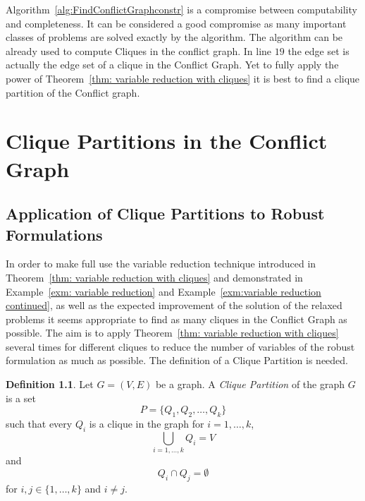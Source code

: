 \documentclass[titlepage, a4paper]{amsbook}
\theoremstyle{plain}
\theoremstyle{break}
\theoremstyle{definition}
\newtheorem{dfn}[thm]{Definition}
\theoremstyle{remark}
\numberwithin{equation}{thm}
\begin{document}
Algorithm~\ref{alg:FindConflictGraphconstr} is a compromise between computability and completeness. It can be considered a good compromise as many important classes of problems are solved exactly by the algorithm.
The algorithm can be already used to compute Cliques in the conflict graph. In line $19$ the edge set is actually the edge set of a clique in the Conflict Graph. Yet to fully apply the power of Theorem~\ref{thm: variable reduction with cliques} it is best to find a clique partition of the Conflict graph.


\chapter{Clique Partitions in the Conflict Graph}
\section{Application of Clique Partitions to Robust Formulations}
In order to make full use the variable reduction technique introduced in Theorem~\ref{thm: variable reduction with cliques} and demonstrated in Example~\ref{exm: variable reduction} and Example~\ref{exm:variable reduction continued}, as well as the expected improvement of the solution of the relaxed problems it seems appropriate to find as many cliques in the Conflict Graph as possible. The aim is to apply Theorem~\ref{thm: variable reduction with cliques} several times for different cliques to reduce the number of variables of the robust formulation as much as possible. The definition of a Clique Partition is needed.
\begin{dfn}
Let $G=(V,E)$ be a graph. A \emph{Clique Partition} of the graph $G$ is a set \[P=\{Q_1, Q_2, \ldots, Q_k\}\] such that every $Q_i$ is a clique in the graph for $i=1, \ldots, k$, 
\[\bigcup_{i=1, \ldots, k}Q_i = V\]
and \[Q_i \cap Q_j = \emptyset\]
for $i,j \in \{1, \ldots, k\}$ and $i \neq j$.
\end{dfn}
\end{document}
